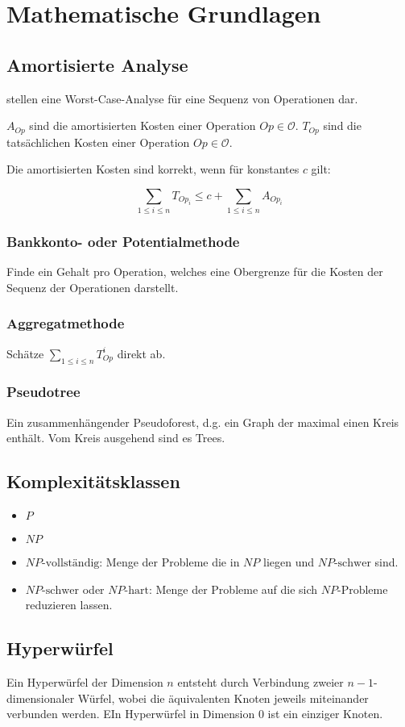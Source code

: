 \chapter{Mathematische Grundlagen}
\section{Amortisierte Analyse}

 stellen eine Worst-Case-Analyse für eine Sequenz von Operationen dar.

$A_{Op}$ sind die amortisierten Kosten einer Operation $Op \in \mathcal{O}$.
$T_{Op}$ sind die tatsächlichen Kosten einer Operation $Op \in \mathcal{O}$.

Die amortisierten Kosten sind korrekt, wenn für konstantes $c$ gilt:

\begin{equation}
	\sum_{1\leq i \leq n}T_{Op_i} \leq c + \sum_{1 \leq i \leq n}A_{Op_i}
\end{equation}

\subsection{Bankkonto- oder Potentialmethode}
Finde ein Gehalt pro Operation, welches eine Obergrenze für die Kosten der Sequenz der Operationen darstellt. 

\subsection{Aggregatmethode}
Schätze $\sum_{1 \leq i \leq n}{T_{Op}^i}$ direkt ab.

\subsection{Pseudotree}
Ein zusammenhängender Pseudoforest, d.g. ein Graph der maximal einen Kreis enthält. Vom Kreis ausgehend sind es Trees.

\section{Komplexitätsklassen}
 
\begin{itemize}
	\item $P$ 
	\item $NP$
	\item $NP\text{-vollständig}$: Menge der Probleme die in $NP$ liegen und $NP\text{-schwer}$ sind.
	\item $NP\text{-schwer}$ oder $NP\text{-hart}$: Menge der Probleme auf die sich $NP\text{-Probleme}$ reduzieren lassen.
\end{itemize}

\section{Hyperwürfel}
Ein Hyperwürfel der Dimension $n$ entsteht durch Verbindung zweier $n-1$-dimensionaler Würfel, wobei die äquivalenten Knoten jeweils miteinander verbunden werden. EIn Hyperwürfel in Dimension 0 ist ein einziger Knoten.